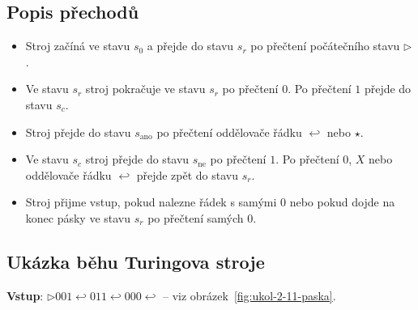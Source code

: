 \documentclass[10pt, a4paper]{ReportSheet}
\begin{document}
    \subsection*{Popis přechodů}
    \begin{itemize}
        \item Stroj začíná ve stavu $s_0$ a přejde do stavu $s_r$ po přečtení počátečního stavu $\triangleright$.
        \item Ve stavu $s_r$ stroj pokračuje ve stavu $s_r$ po přečtení $0$. Po přečtení $1$ přejde do stavu $s_c$.
        \item Stroj přejde do stavu $s_{\text{ano}}$ po přečtení oddělovače řádku $\hookleftarrow$ nebo $\star$.
        \item Ve stavu $s_c$ stroj přejde do stavu $s_{\text{ne}}$ po přečtení $1$. Po přečtení $0$, $X$ nebo oddělovače řádku $\hookleftarrow$ přejde zpět do stavu $s_r$.
        \item Stroj přijme vstup, pokud nalezne řádek s samými $0$ nebo pokud dojde na konec pásky ve stavu $s_r$ po přečtení samých $0$.
    \end{itemize}

    \subsection*{Ukázka běhu Turingova stroje}
    \textbf{Vstup}: $\triangleright 001 \hookleftarrow 011 \hookleftarrow 000 \hookleftarrow$ – viz obrázek~\ref{fig:ukol-2-11-paska}.
\end{document}
